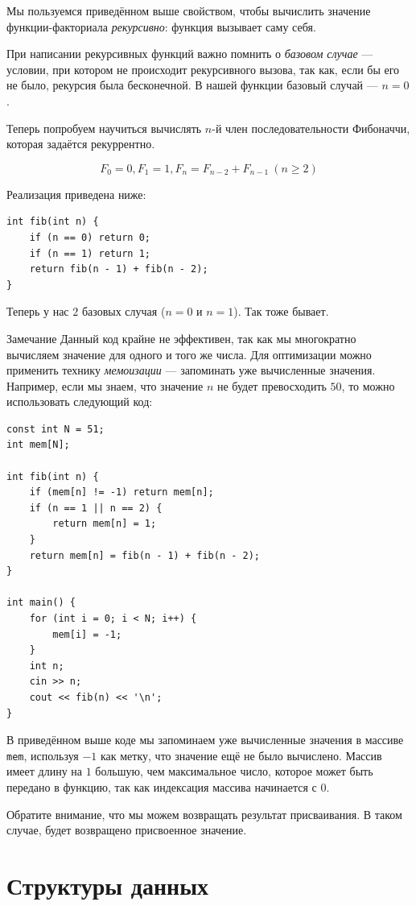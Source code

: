 \documentclass{article}
\newcommand{\note}[1]{
	\begin{sectionenv}[yellow!30!white]{Замечание}
		#1
	\end{sectionenv}
}
\begin{document}
	Мы пользуемся приведённом выше свойством, чтобы вычислить значение функции-факториала \textit{рекурсивно}: функция вызывает саму себя.
	
	При написании рекурсивных функций важно помнить о \textit{базовом случае} --- условии, при котором не происходит рекурсивного вызова, так как, если бы его не было, рекурсия была бесконечной. В нашей функции базовый случай --- $n=0$.
	
	Теперь попробуем научиться вычислять $n$-й член последовательности Фибоначчи, которая задаётся рекуррентно.

	$$F_0=0, F_1=1, F_n = F_{n-2}+F_{n-1}\ (n \ge 2)$$

	Реализация приведена ниже:

	\begin{lstlisting}
int fib(int n) {
	if (n == 0) return 0;
	if (n == 1) return 1;
	return fib(n - 1) + fib(n - 2);
}
	\end{lstlisting}
	
	Теперь у нас $2$ базовых случая ($n=0$ и $n=1$). Так тоже бывает.
	
	\note{Данный код крайне не эффективен, так как мы многократно вычисляем значение для одного и того же числа. Для оптимизации можно применить технику \textit{мемоизации} --- запоминать уже вычисленные значения. Например, если мы знаем, что значение $n$ не будет превосходить $50$, то можно использовать следующий код:}
	
	\begin{lstlisting}
const int N = 51;
int mem[N];

int fib(int n) {
	if (mem[n] != -1) return mem[n];
	if (n == 1 || n == 2) {
		return mem[n] = 1;
	}
	return mem[n] = fib(n - 1) + fib(n - 2);
}

int main() {
	for (int i = 0; i < N; i++) {
		mem[i] = -1;
	}
	int n;
	cin >> n;
	cout << fib(n) << '\n';
}
	\end{lstlisting}
	
	В приведённом выше коде мы запоминаем уже вычисленные значения в массиве \texttt{mem}, используя $-1$ как метку, что значение ещё не было вычислено. Массив имеет длину на $1$ большую, чем максимальное число, которое может быть передано в функцию, так как индексация массива начинается с $0$.
	
	Обратите внимание, что мы можем возвращать результат присваивания. В таком случае, будет возвращено присвоенное значение.
	
	\section{Структуры данных}
	
\end{document}
